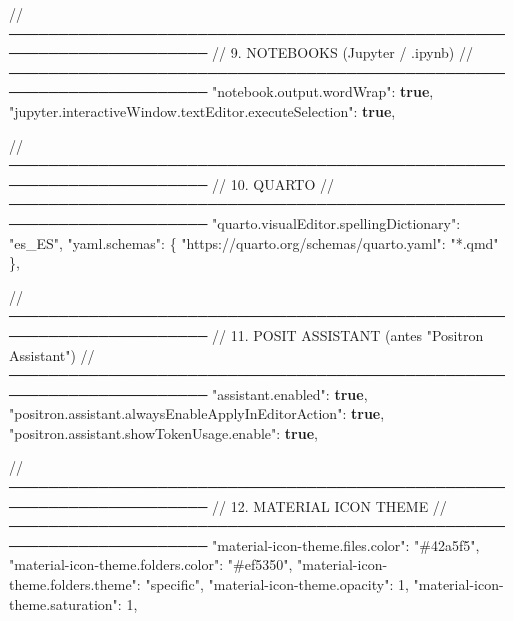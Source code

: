 \documentclass[
  doc,
  floatsintext,
  longtable,
  a4paper,
  nolmodern,
  notxfonts,
  notimes,
  12pt,
  colorlinks=true,linkcolor=blue,citecolor=blue,urlcolor=blue]{apa7}
\newenvironment{Shaded}{\begin{snugshade}}{\end{snugshade}}
\newcommand{\DataTypeTok}[1]{\textcolor[rgb]{0.68,0.00,0.00}{#1}}
\newcommand{\DecValTok}[1]{\textcolor[rgb]{0.68,0.00,0.00}{#1}}
\newcommand{\ErrorTok}[1]{\textcolor[rgb]{0.68,0.00,0.00}{#1}}
\newcommand{\FunctionTok}[1]{\textcolor[rgb]{0.28,0.35,0.67}{#1}}
\newcommand{\KeywordTok}[1]{\textcolor[rgb]{0.00,0.23,0.31}{\textbf{#1}}}
\newcommand{\StringTok}[1]{\textcolor[rgb]{0.13,0.47,0.30}{#1}}
\begin{document}
\begin{Shaded}
\begin{Highlighting}[]
  \ErrorTok{//} \ErrorTok{──────────────────────────────────────────────────────────────────────}
  \ErrorTok{//} \ErrorTok{9.} \ErrorTok{NOTEBOOKS} \ErrorTok{(Jupyter} \ErrorTok{/} \ErrorTok{.ipynb)}
  \ErrorTok{//} \ErrorTok{──────────────────────────────────────────────────────────────────────}
  \DataTypeTok{"notebook.output.wordWrap"}\FunctionTok{:} \KeywordTok{true}\FunctionTok{,}
  \DataTypeTok{"jupyter.interactiveWindow.textEditor.executeSelection"}\FunctionTok{:} \KeywordTok{true}\FunctionTok{,}

  \ErrorTok{//} \ErrorTok{──────────────────────────────────────────────────────────────────────}
  \ErrorTok{//} \ErrorTok{10.} \ErrorTok{QUARTO}
  \ErrorTok{//} \ErrorTok{──────────────────────────────────────────────────────────────────────}
  \DataTypeTok{"quarto.visualEditor.spellingDictionary"}\FunctionTok{:} \StringTok{"es\_ES"}\FunctionTok{,}
  \DataTypeTok{"yaml.schemas"}\FunctionTok{:} \FunctionTok{\{}
    \DataTypeTok{"https://quarto.org/schemas/quarto.yaml"}\FunctionTok{:} \StringTok{"*.qmd"}
  \FunctionTok{\},}

  \ErrorTok{//} \ErrorTok{──────────────────────────────────────────────────────────────────────}
  \ErrorTok{//} \ErrorTok{11.} \ErrorTok{POSIT} \ErrorTok{ASSISTANT} \ErrorTok{(antes} \DataTypeTok{"Positron Assistant"}\ErrorTok{)}
  \ErrorTok{//} \ErrorTok{──────────────────────────────────────────────────────────────────────}
  \DataTypeTok{"assistant.enabled"}\FunctionTok{:} \KeywordTok{true}\FunctionTok{,}
  \DataTypeTok{"positron.assistant.alwaysEnableApplyInEditorAction"}\FunctionTok{:} \KeywordTok{true}\FunctionTok{,}
  \DataTypeTok{"positron.assistant.showTokenUsage.enable"}\FunctionTok{:} \KeywordTok{true}\FunctionTok{,}

  \ErrorTok{//} \ErrorTok{──────────────────────────────────────────────────────────────────────}
  \ErrorTok{//} \ErrorTok{12.} \ErrorTok{MATERIAL} \ErrorTok{ICON} \ErrorTok{THEME}
  \ErrorTok{//} \ErrorTok{──────────────────────────────────────────────────────────────────────}
  \DataTypeTok{"material{-}icon{-}theme.files.color"}\FunctionTok{:} \StringTok{"\#42a5f5"}\FunctionTok{,}
  \DataTypeTok{"material{-}icon{-}theme.folders.color"}\FunctionTok{:} \StringTok{"\#ef5350"}\FunctionTok{,}
  \DataTypeTok{"material{-}icon{-}theme.folders.theme"}\FunctionTok{:} \StringTok{"specific"}\FunctionTok{,}
  \DataTypeTok{"material{-}icon{-}theme.opacity"}\FunctionTok{:} \DecValTok{1}\FunctionTok{,}
  \DataTypeTok{"material{-}icon{-}theme.saturation"}\FunctionTok{:} \DecValTok{1}\FunctionTok{,}


\end{Highlighting}
\end{Shaded}
\end{document}
